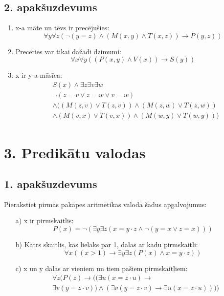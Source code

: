 \documentclass{article}
\begin{document}
\subsection*{2. apakšuzdevums}

\begin{enumerate}
    \item x-a māte un tēvs ir precējušies:
          \[
              \forall y \forall z (\neg(y = z) \land (M(x, y) \land T(x, z)) \rightarrow P(y, z))
          \]

    \item Precēties var tikai dažādi dzimumi:
          \[
              \forall x \forall y ((P(x, y) \land V(x)) \rightarrow S(y))
          \]

    \item x ir y-a māsīca:
          \begin{align*}
               & S(x) \land \exists z \exists v \exists w                    \\
               & \neg (z = v \lor z = w \lor v = w)                          \\
               & \land ((M(z, v) \lor T(z, v)) \land (M(z, w) \lor T(z, w))  \\
               & \land (M(v, x) \lor T(v, x)) \land  (M(w, y) \lor T(w, y))) \\
          \end{align*}
\end{enumerate}

\pagebreak

\section*{3. Predikātu valodas}

\subsection*{1. apakšuzdevums}

Pierakstiet pirmās pakāpes aritmētikas valodā šādus apgalvojumus:

\begin{enumerate}
    \item[a)] x ir pirmskaitlis:
        \[
            P(x) = \neg (\exists y \exists z (x = y \cdot z \land \neg (y = x \lor z = x)))
        \]

    \item[b)] Katrs skaitlis, kas lielāks par 1, dalās ar kādu pirmskaitli:
        \[
            \forall x ((x > 1) \rightarrow \exists y \exists z (P(x) \land x = y \cdot z))
        \]

    \item[c)] x un y dalās ar vieniem un tiem pašiem pirmskaitļiem:
        \begin{align*}
             & \forall z (P(z) \rightarrow ((\exists u (x = z \cdot u) \rightarrow                                  \\
             & \exists v (y = z \cdot v)) \land (\exists v (y = z \cdot v) \rightarrow \exists u (x = z \cdot u))))
        \end{align*}
\end{enumerate}
\end{document}

